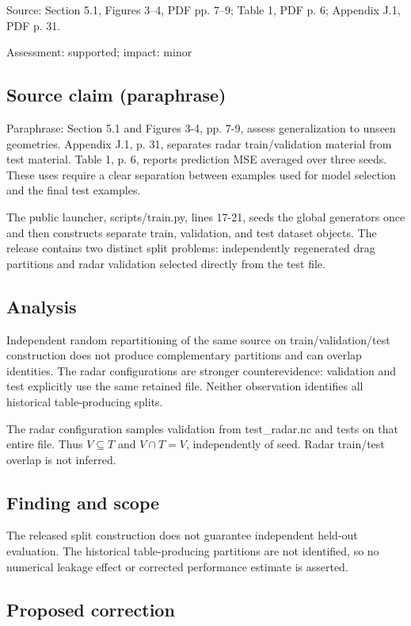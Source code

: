 \documentclass[11pt]{article}
\begin{document}
Source: Section 5.1, Figures 3–4, PDF pp. 7–9; Table 1, PDF p. 6; Appendix J.1, PDF p. 31.

Assessment: supported; impact: minor

\subsection*{Source claim (paraphrase)}

Paraphrase: Section 5.1 and Figures 3-4, pp. 7-9, assess generalization to unseen geometries. Appendix J.1, p. 31, separates radar train/validation material from test material. Table 1, p. 6, reports prediction MSE averaged over three seeds. These uses require a clear separation between examples used for model selection and the final test examples.

The public launcher, scripts/train.py, lines 17-21, seeds the global generators once and then constructs separate train, validation, and test dataset objects. The release contains two distinct split problems: independently regenerated drag partitions and radar validation selected directly from the test file.

\subsection*{Analysis}

Independent random repartitioning of the same source on train/validation/test construction does not produce complementary partitions and can overlap identities. The radar configurations are stronger counterevidence: validation and test explicitly use the same retained file. Neither observation identifies all historical table-producing splits.

The radar configuration samples validation from test\_radar.nc and tests on that entire file. Thus \(V\subseteq T\) and \(V\cap T=V\), independently of seed. Radar train/test overlap is not inferred.

\subsection*{Finding and scope}

The released split construction does not guarantee independent held-out evaluation. The historical table-producing partitions are not identified, so no numerical leakage effect or corrected performance estimate is asserted.

\subsection*{Proposed correction}
\end{document}
